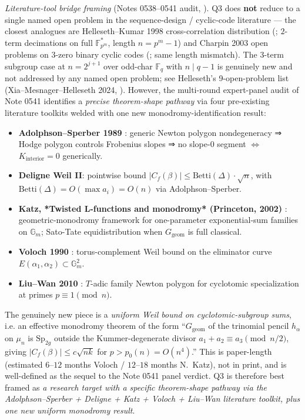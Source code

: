 \documentclass[11pt]{article}
\theoremstyle{definition}
\theoremstyle{remark}
\newcommand{\FF}{\mathbb{F}}
\begin{document}
\emph{Literature-tool bridge framing} (Notes 0538--0541 audit,
\cite{CompanionRepo}). Q3 does \textbf{not} reduce to a single named
open problem in the sequence-design / cyclic-code literature — the
closest analogues are Helleseth--Kumar 1998 cross-correlation
distribution (\cite{HellesethKumar1998}; $2$-term decimations on full
$\FF_{p^m}^*$, length $n = p^m - 1$) and Charpin 2003 open problems
on $3$-zero binary cyclic codes (\cite{CharpinHandbook}; same length
mismatch). The $3$-term subgroup case at $n = 2^{j+1}$ over odd-char
$\FF_q$ with $n \mid q - 1$ is genuinely new and not addressed by
any named open problem; see Helleseth's 9-open-problem list
(Xia--Mesnager--Helleseth 2024, \cite{XiaMesnagerHelleseth2024}).
However, the multi-round expert-panel audit of Note 0541 identifies a
\emph{precise theorem-shape pathway} via four pre-existing literature
toolkits welded with one new monodromy-identification result:

\begin{itemize}\itemsep0pt
\item \textbf{Adolphson--Sperber 1989} \cite{AdolphsonSperber1989}:
generic Newton polygon nondegeneracy ⇒ Hodge polygon controls
Frobenius slopes ⇒ no slope-$0$ segment $\Leftrightarrow$ $K_\text{interior} = 0$
generically.
\item \textbf{Deligne Weil II}: pointwise bound
$|C_f(\beta)| \leq \mathrm{Betti}(\Delta) \cdot \sqrt n$, with
$\mathrm{Betti}(\Delta) = O(\max a_i) = O(n)$ via Adolphson--Sperber.
\item \textbf{Katz, *Twisted L-functions and monodromy* (Princeton, 2002)}
\cite{Katz2002}: geometric-monodromy framework for one-parameter
exponential-sum families on $\mathbb{G}_m$; Sato-Tate equidistribution
when $G_\text{geom}$ is full classical.
\item \textbf{Voloch 1990} \cite{Voloch1990}: torus-complement Weil
bound on the eliminator curve $E(\alpha_1, \alpha_2) \subset \mathbb{G}_m^2$.
\item \textbf{Liu--Wan 2010} \cite{LiuWan2010}: $T$-adic family Newton
polygon for cyclotomic specialization at primes $p \equiv 1 \pmod n$.
\end{itemize}

The genuinely new piece is a \emph{uniform Weil bound on cyclotomic-subgroup
sums}, i.e. an effective monodromy theorem of the form ``$G_\text{geom}$ of
the trinomial pencil $h_\alpha$ on $\mu_n$ is $\mathrm{Sp}_{2g}$ outside
the Kummer-degenerate divisor $a_1 + a_2 \equiv a_3 \pmod{n/2}$, giving
$|C_f(\beta)| \leq c\sqrt{nk}$ for $p > p_0(n) = O(n^4)$.''
This is paper-length (estimated $6$--$12$ months Voloch / $12$--$18$ months
N.~Katz), not in print, and is well-defined as the sequel to the Note 0541
panel verdict. Q3 is therefore best framed as \emph{a research target with
a specific theorem-shape pathway via the Adolphson--Sperber + Deligne +
Katz + Voloch + Liu--Wan literature toolkit, plus one new uniform
monodromy result}.
\end{document}

